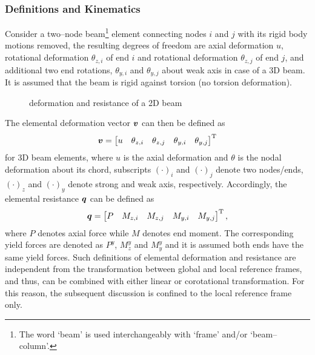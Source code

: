 \subsubsection{Definitions and Kinematics}
Consider a two--node beam\footnote{The word `beam' is used interchangeably with `frame' and/or `beam--column'.} element connecting nodes $i$ and $j$ with its rigid body motions removed, the resulting degrees of freedom are axial deformation $u$, rotational deformation $\theta_{z,i}$ of end $i$ and rotational deformation $\theta_{z,j}$ of end $j$, and additional two end rotations, $\theta_{y,i}$ and $\theta_{y,j}$ about weak axis in case of a 3D beam.
It is assumed that the beam is rigid against torsion (no torsion deformation).
\begin{figure}[H]
\centering
{}
\caption{deformation and resistance of a 2D beam}
\end{figure}

The elemental deformation vector $\bm{v}$ can then be defined as
\begin{gather}
\bm{v}=\begin{bmatrix}
u&\theta_{z,i}&\theta_{z,j}&\theta_{y,i}&\theta_{y,j}
\end{bmatrix}^{\mathrm{T}}
\end{gather}
for 3D beam elements, where $u$ is the axial deformation and $\theta$ is the nodal deformation about its chord, subscripts $\left(\cdot\right)_i$ and $\left(\cdot\right)_j$ denote two nodes/ends, $\left(\cdot\right)_z$ and $\left(\cdot\right)_y$ denote strong and weak axis, respectively.
Accordingly, the elemental resistance $\bm{q}$ can be defined as
\begin{gather}
\bm{q}=\begin{bmatrix}
P&M_{z,i}&M_{z,j}&M_{y,i}&M_{y,j}
\end{bmatrix}^{\mathrm{T}},
\end{gather}
where $P$ denotes axial force while $M$ denotes end moment.
The corresponding yield forces are denoted as $P^y$, $M_z^y$ and $M_y^y$ and it is assumed both ends have the same yield forces.
Such definitions of elemental deformation and resistance are independent from the transformation between global and local reference frames, and thus, can be combined with either linear or corotational transformation.
For this reason, the subsequent discussion is confined to the local reference frame only.

